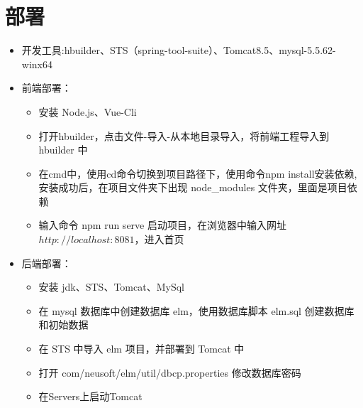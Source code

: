 \section{部署}
\begin{itemize}
    \item{开发工具}:hbuilder、STS（spring-tool-suite）、Tomcat8.5、mysql-5.5.62-winx64
    \item {前端部署}：
          \begin{itemize}
              \item 安装 Node.js、Vue-Cli
              \item 打开hbuilder，点击文件-导入-从本地目录导入，将前端工程导入到 hbuilder 中
              \item 在cmd中，使用cd命令切换到项目路径下，使用命令npm install安装依赖, 安装成功后，在项目文件夹下出现 node\_modules 文件夹，里面是项目依赖
              \item 输入命令 npm run serve 启动项目，在浏览器中输入网址 $http://localhost:8081$，进入首页
          \end{itemize}
    \item {后端部署}：
          \begin{itemize}
              \item 安装 jdk、STS、Tomcat、MySql
              \item 在 mysql 数据库中创建数据库 elm，使用数据库脚本 elm.sql 创建数据库和初始数据
              \item 在 STS 中导入 elm 项目，并部署到 Tomcat 中
              \item 打开 com/neusoft/elm/util/dbcp.properties 修改数据库密码
              \item 在Servers上启动Tomcat
          \end{itemize}
\end{itemize}

